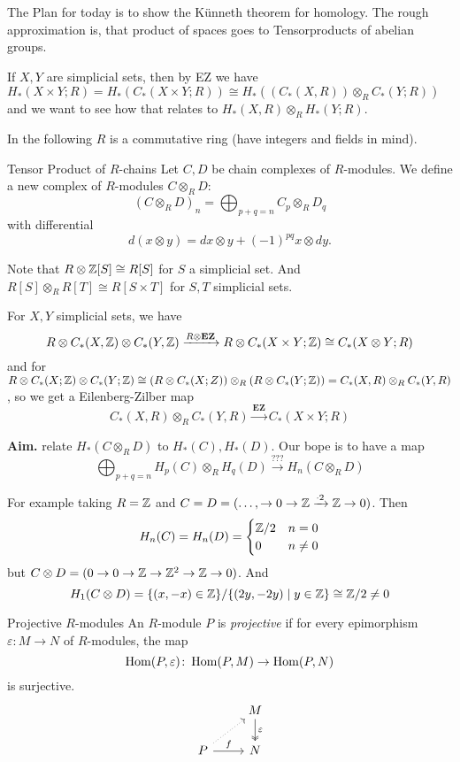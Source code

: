 \documentclass[language=english]{TemplateLecture}
\begin{document}


The Plan for today is to show the Künneth theorem for homology. The rough approximation is, that product of spaces goes to Tensorproducts of abelian groups.

If \(X,Y\) are simplicial sets, then by EZ we have \(H_*(X\times Y; R) = H_*(C_*(X\times Y; R)) \cong H_*((C_*(X,R)) \otimes_R C_*(Y; R))\) and we want to see how that relates to \(H_*(X,R) \otimes_R H_*(Y; R)\).

In the following \(R\) is a commutative ring (have integers and fields in mind).

\begin{defi}{Tensor Product of \(R\)-chains}{}
Let \(C,D\) be chain complexes of \(R\)-modules. We define a new complex of \(R\)-modules \(C \otimes_R D\):
\[(C\otimes_R D)_n = \bigoplus_{p+q = n} C_p \otimes_R D_q\]
with differential
\[d(x\otimes y) = dx \otimes y + (-1)^{pq} x\otimes dy.\]
\end{defi}

Note that \(R \otimes \mathbb{Z}[S] \cong R[S]\) for \(S\) a simplicial set. And \(R[S] \otimes_R R [T] \cong R[S\times T]\) for \(S,T\) simplicial sets.

For \(X,Y\) simplicial sets, we have
\[R\otimes C_*(X,\mathbb{Z}) \otimes C_*(Y,\mathbb{Z}) \xrightarrow{R\otimes \mathbf{EZ}} R\otimes C_*(X\times Y; \mathbb{Z}) \cong C_*(X\otimes Y; R)\]
and for \(R\otimes C_*(X; \mathbb{Z}) \otimes C_*(Y; \mathbb{Z}) \cong (R\otimes C_*(X;Z)) \otimes_R (R \otimes C_*(Y; \mathbb{Z})) = C_*(X,R) \otimes_R C_*(Y,R)\), so we get a Eilenberg-Zilber map
\[C_*(X,R)\otimes_R C_*(Y,R) \xrightarrow{\mathbf{EZ}} C_*(X\times Y; R)\]

\textbf{Aim.} relate \(H_*(C\otimes_R D)\) to \(H_*(C), H_*(D)\). Our bope is to have a map
\[\bigoplus_{p+q = n} H_p(C) \otimes_R H_q(D) \xrightarrow{???} H_n(C\otimes_R D)\]

For example taking \(R = \mathbb{Z}\) and \(C = D = (\dots ,\rightarrow 0\rightarrow \mathbb{Z} \xrightarrow{\cdot 2}\mathbb{Z} \rightarrow 0)\). Then
\[H_n(C) = H_n(D) = \begin{cases}
    \mathbb{Z}/2 & n = 0 \\
    0 & n \neq 0 \\
\end{cases}\]
but \(C \otimes D = (0\rightarrow 0 \rightarrow \mathbb{Z} \rightarrow \mathbb{Z}^2 \rightarrow \mathbb{Z} \rightarrow 0)\). And 
\[H_1(C\otimes D) = \{(x,-x) \in \mathbb{Z}\}/\{(2y, -2y) \mid y\in \mathbb{Z}\} \cong \mathbb{Z}/2 \neq 0\]

\begin{defi}{Projective \(R\)-modules}{}
    An \(R\)-module \(P\) is \emph{projective} if for every epimorphism \(\varepsilon \colon M\to N\) of \(R\)-modules, the map
    \[\operatorname{Hom}(P, \varepsilon) \colon \operatorname{Hom}(P, M) \to \operatorname{Hom}(P, N)\]
    is surjective.
    \[\begin{tikzcd}
        & M \ar[d, "\varepsilon", two heads] \\
        P \ar[ru, dotted] \ar[r, "f"] & N \\
    \end{tikzcd}\]
\end{defi}
\end{document}

